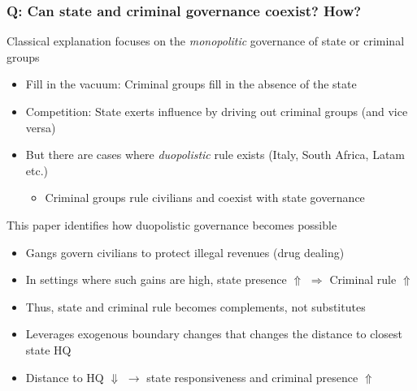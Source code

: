 \documentclass[aspectratio=169]{beamer}
\begin{document}
\begin{frame}
\frametitle{Q: Can state and criminal governance coexist? How?} 
Classical explanation focuses on the \textit{monopolitic} governance of state or criminal groups
\begin{itemize}\setlength\itemsep{3pt}
\item Fill in the vacuum: Criminal groups fill in the absence of the state
\item Competition: State exerts influence by driving out criminal groups (and vice versa)
\item But there are cases where \textit{duopolistic} rule exists (Italy, South Africa, Latam etc.)
\begin{itemize}
\item Criminal groups rule civilians and coexist with state governance
\end{itemize}
\end{itemize}\medskip
This paper identifies how duopolistic governance becomes possible
\begin{itemize}\setlength\itemsep{3pt}
  \item Gangs govern civilians to protect illegal revenues (drug dealing)
  \item In settings where such gains are high, state presence $\Uparrow$ $\Rightarrow$ Criminal rule $\Uparrow$
  \item Thus, state and criminal rule becomes complements, not substitutes
  \item Leverages exogenous boundary changes that changes the distance to closest state HQ
  \item Distance to HQ $\Downarrow$ $\to$ state responsiveness and criminal presence $\Uparrow$
\end{itemize}
\end{frame}
\end{document}
